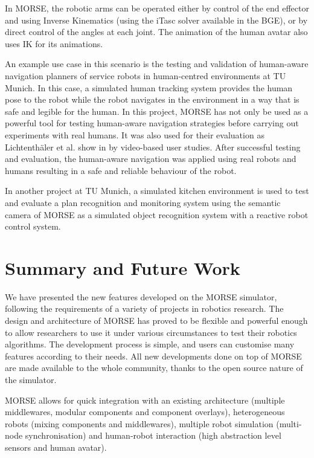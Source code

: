 \documentclass{llncs}
\begin{document}
In MORSE, the robotic arms can be operated either by control of the end
effector and using Inverse Kinematics (using the iTasc \cite{iTaSC} solver
available in the BGE), or by direct control of the angles at each joint.
The animation of the human avatar also uses IK for its animations.

An example use case in this scenario is the testing and validation of human-aware
navigation planners of service robots in human-centred environments at TU Munich. 
In this case, a simulated human tracking system provides the human pose to the
robot while the robot navigates in the environment in a way that is safe and
legible for the human. In this project, MORSE has not only be used as a
powerful tool for testing human-aware navigation strategies before carrying out
experiments with real humans. It was also used for their evaluation as 
Lichtenth{\"a}ler et al. show in \cite{lichtenthaeler2012increasing} by 
video-based user studies. After successful testing and evaluation, the 
human-aware navigation was applied using real robots and humans resulting in 
a safe and reliable behaviour of the robot.

In another project at TU Munich, a simulated kitchen environment is used
to test and evaluate a plan recognition and monitoring system using the 
semantic camera of MORSE as a simulated object recognition system with 
a reactive robot control system.


\section{Summary and Future Work}
\label{section:discussion}

We have presented the new features developed on the MORSE simulator,
following the requirements of a variety of projects in robotics research.
The design and architecture of MORSE has proved to be flexible and powerful
enough to allow researchers to use it under various circumstances to test their
robotics algorithms. The development process is simple, and users can customise
many features according to their needs.
All new developments done on top of MORSE are made available to the whole
community, thanks to the open source nature of the simulator.

MORSE allows for quick integration with an existing architecture (multiple
middlewares, modular components and component overlays), heterogeneous robots
(mixing components and middlewares), multiple robot simulation (multi-node
synchronisation) and human-robot interaction (high abstraction level sensors
and human avatar).
\end{document}
